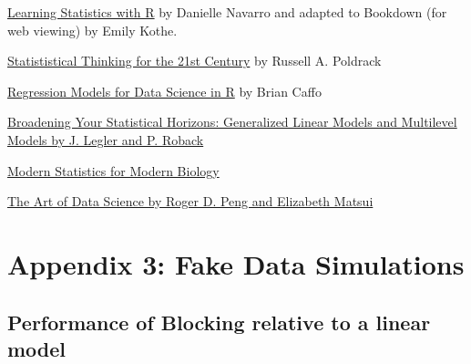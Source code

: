 \documentclass[]{book}
\begin{document}
\href{https://https://learningstatisticswithr-bookdown.netlify.com}{Learning Statistics with R} by Danielle Navarro and adapted to Bookdown (for web viewing) by Emily Kothe.

\href{http://statsthinking21.org}{Statististical Thinking for the 21st Century} by Russell A. Poldrack

\href{https://leanpub.com/regmods}{Regression Models for Data Science in R} by Brian Caffo

\href{https://bookdown.org/roback/bookdown-bysh/}{Broadening Your Statistical Horizons: Generalized Linear Models and Multilevel Models by J. Legler and P. Roback}

\href{https://www.huber.embl.de/msmb/index.html}{Modern Statistics for Modern Biology}

\href{https://bookdown.org/rdpeng/artofdatascience/}{The Art of Data Science by Roger D. Peng and Elizabeth Matsui}

\hypertarget{appendix-3-fake-data-simulations}{%
\chapter*{Appendix 3: Fake Data Simulations}\label{appendix-3-fake-data-simulations}}

\hypertarget{performance-of-blocking-relative-to-a-linear-model}{%
\section{Performance of Blocking relative to a linear model}\label{performance-of-blocking-relative-to-a-linear-model}}
\end{document}
